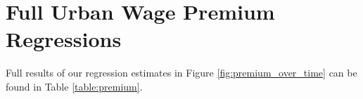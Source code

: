 \documentclass[12pt,twoside]{article}
\begin{document}
\newpage \appendix
\renewcommand{\thetable}{\Alph{section}.\arabic{table}}
\renewcommand{\thefigure}{\Alph{section}.\arabic{figure}}


\section{Full Urban Wage Premium Regressions}
\setcounter{table}{0}
\setcounter{figure}{0}

Full results of our regression estimates in Figure \ref{fig:premium_over_time} can be found in Table \ref{table:premium}.
\end{document}
